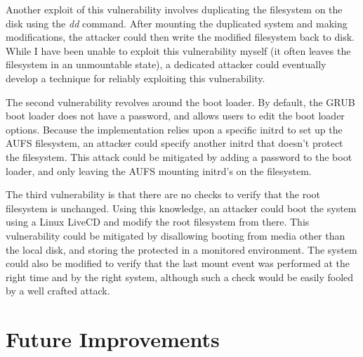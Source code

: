 \documentclass[12pt]{article}
\begin{document}
Another exploit of this vulnerability involves duplicating the filesystem on 
the disk using the \emph{dd} command.  After mounting the duplicated system
and making modifications, the attacker could then write the modified 
filesystem back to disk.  While I have been unable to exploit this 
vulnerability myself (it often leaves the filesystem in an unmountable state),
a dedicated attacker could eventually develop a technique for reliably 
exploiting this vulnerability.

The second vulnerability revolves around the boot loader.  By default, the 
GRUB boot loader does not have a password, and allows users to edit the boot
loader options.  Because the implementation relies upon a specific initrd
to set up the AUFS filesystem, an attacker could specify another initrd 
that doesn't protect the filesystem.  This attack could be mitigated by 
adding a password to the boot loader, and only leaving the AUFS mounting 
initrd's on the filesystem.

The third vulnerability is that there are no checks to verify that the root
filesystem is unchanged.  Using this knowledge, an attacker could boot the 
system using a Linux LiveCD and modify the root filesystem from there.  
This vulnerability could be mitigated by disallowing booting from media other 
than the local disk, and storing the protected in a monitored environment. 
The system could also be modified to verify that the last mount event 
was performed at the right time and by the right system, although such a check
would be easily fooled by a well crafted attack.  

\section{Future Improvements}
\end{document}
